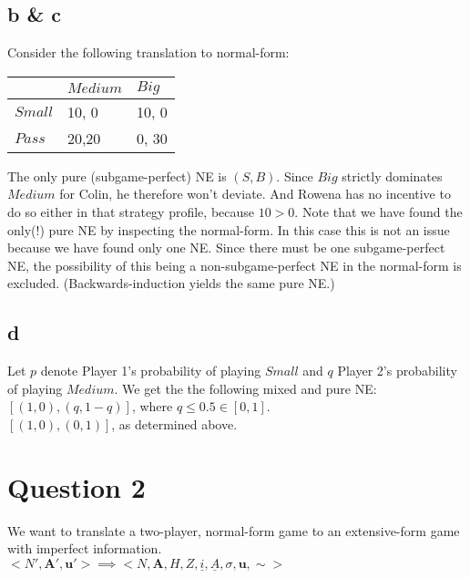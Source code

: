 \documentclass[10pt,a4paper]{article}
\begin{document}
\subsection*{b \& c}
Consider the following translation to normal-form:
\begin{table}[h]
\centering
\begin{tabular}[l]{|l|l|l|}
\hline
          & $Medium$ & $Big$  \\ \hline
$Small$     & 10, 0   & 10, 0 \\ \hline
$Pass$	& 20,20 & 0, 30 \\ \hline
\end{tabular}
\end{table}
\noindent The only pure (subgame-perfect) NE is $(S,B)$. Since $Big$ strictly dominates $Medium$ for Colin, he therefore won't deviate. And Rowena has no incentive to do so either in that strategy profile, because $10>0$. Note that we have found the only(!) pure NE by inspecting the normal-form. In this case this is not an issue because we have found only one NE. Since there must be one subgame-perfect NE, the possibility of this being a non-subgame-perfect NE in the normal-form is excluded. (Backwards-induction yields the same pure NE.)
\subsection*{d} 
Let $p$ denote Player 1's probability of playing $Small$ and $q$ Player 2's probability of playing $Medium$. We get the the following mixed and pure NE:\\
 $[(1,0),(q,1-q)]$, where $q\leq 0.5\in [0,1]$.\\
$[(1,0),(0,1)]$, as determined above.
\section*{Question 2}
We want to translate a two-player, normal-form game to an extensive-form game with imperfect information.\\
$<N',\boldsymbol{A}',\boldsymbol{u}'> \implies <N,\boldsymbol{A}, H, Z, \underline{i},\underline{A},\sigma,\boldsymbol{u},\sim>$
\end{document}
